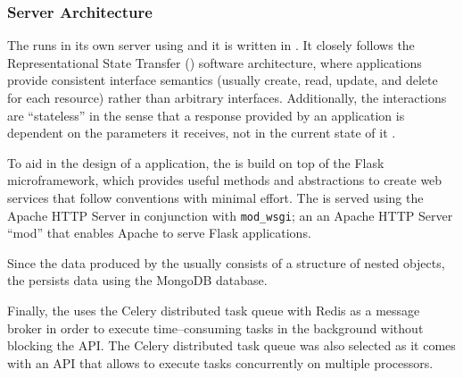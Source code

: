 \subsubsection{Server Architecture} \label{subsubsect:case-study:arch:server}

The \mlblinkapi runs in its own server using \ubuntu and it is written in \python. It closely follows the Representational State Transfer (\rest) software architecture, where applications provide consistent interface semantics (usually create, read, update, and delete for each resource) rather than arbitrary interfaces. Additionally, the \rest interactions are ``stateless'' in the sense that a response provided by an application is dependent on the parameters it receives, not in the current state of it \cite{web:w3:rest}.

To aid in the design of a \rest application, the \mlblinkapi is build on top of the Flask microframework, which provides useful methods and abstractions to create web services that follow \rest conventions with minimal effort. The \mlblinkapi is served using the Apache HTTP Server in conjunction with \texttt{mod\_wsgi}; an an Apache HTTP Server ``mod'' that enables Apache to serve Flask applications.

Since the data produced by the \mlblinkui usually consists of a structure of nested objects, the \mlblinkapi persists data using the MongoDB database. 

Finally, the \mlblinkapi uses the Celery distributed task queue with Redis as a message broker in order to execute time--consuming tasks in the background without blocking the API. The Celery distributed task queue was also selected as it comes with an API that allows to execute tasks concurrently on multiple processors.